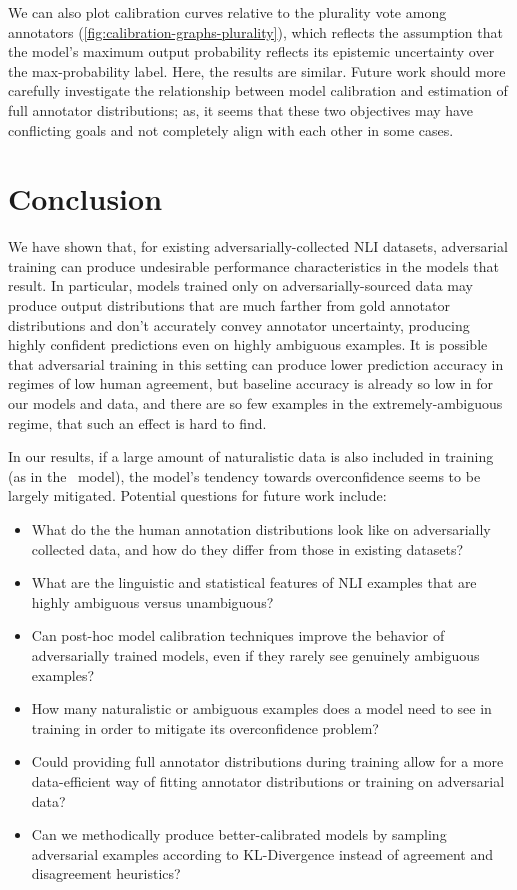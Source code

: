 \documentclass[10pt,a4paper]{article}
\begin{document}
We can also plot calibration curves relative to the plurality vote among annotators (\autoref{fig:calibration-graphs-plurality}), which reflects the assumption that the model's maximum output probability reflects its epistemic uncertainty over the max-probability label. Here, the results are similar.
Future work should more carefully investigate the relationship between model calibration and estimation of full annotator distributions; as, it seems that these two objectives may have conflicting goals and not completely align with each other in some cases.

\section*{Conclusion}

We have shown that, for existing adversarially-collected NLI datasets, adversarial training can produce undesirable performance characteristics in the models that result.
In particular, models trained only on adversarially-sourced data may produce output distributions that are much farther from gold annotator distributions and don't accurately convey annotator uncertainty, producing highly confident predictions even on highly ambiguous examples.
It is possible that adversarial training in this setting can produce lower prediction accuracy in regimes of low human agreement, but baseline accuracy is already so low in for our models and data, and there are so few examples in the extremely-ambiguous regime, that such an effect is hard to find.

In our results, if a large amount of naturalistic data is also included in training (as in the \all\ model), the model's tendency towards overconfidence seems to be largely mitigated.
Potential questions for future work include:
\begin{itemize}
    \item What do the the human annotation distributions look like on adversarially collected data, and how do they differ from those in existing datasets?
    \item What are the linguistic and statistical features of NLI examples that are highly ambiguous versus unambiguous?
    \item Can post-hoc model calibration techniques improve the behavior of adversarially trained models, even if they rarely see genuinely ambiguous examples?
    \item How many naturalistic or ambiguous examples does a model need to see in training in order to mitigate its overconfidence problem?
    \item Could providing full annotator distributions during training allow for a more data-efficient way of fitting annotator distributions or training on adversarial data?
    \item Can we methodically produce better-calibrated models by sampling adversarial examples according to KL-Divergence instead of agreement and disagreement heuristics?
\end{itemize}
\end{document}
